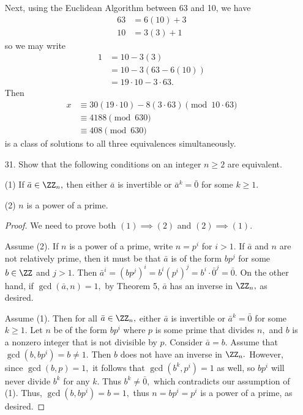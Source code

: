 \documentclass{article}
\begin{document}
\begin{itemize}
\begin{soln}
			Next, using the Euclidean Algorithm between 63 and 10, we have 
			\begin{align*}
				63 &= 6(10) + 3 \\
				10 &= 3(3) + 1
			\end{align*} so we may write 
			\begin{align*}
				1 &= 10 - 3(3) \\
				&= 10 - 3(63 - 6(10)) \\
				&= 19\cdot10-3\cdot63.
			\end{align*} Then 
			\begin{align*}
				x &\equiv 30(19\cdot10)-8(3\cdot63)\pmod{10\cdot63} \\
				&\equiv 4188 \pmod {630} \\
				&\equiv \boxed{408\pmod{630}}
			\end{align*} is a class of solutions to all three equivalences simultaneously. 
		\end{soln}

	\item[31.] Show that the following conditions on an integer $n\ge2$ are equivalent.

		(1) If $\bar{a}\in\ZZ_n,$ then either $\bar{a}$ is invertible or $\bar{a}^k=\bar{0}$ for some $k\ge 1.$

		(2) $n$ is a power of a prime.
		\begin{proof}
			We need to prove both $(1)\implies(2)$ and $(2)\implies(1).$ 

			Assume (2). If $n$ is a power of a prime, write $n=p^i$ for $i>1.$ If $\bar{a}$ and $n$ are not relatively prime, then it must be that $\bar{a}$ is of the form $bp^j$ for some $b\in\ZZ$ and $j>1.$ Then $\bar{a}^i=(bp^j)^i=b^i(p^i)^j=b^i\cdot \bar{0}^j = \bar{0}.$ On the other hand, if $\gcd(\bar{a}, n)=1,$ by Theorem 5, $\bar{a}$ has an inverse in $\ZZ_n,$ as desired.

			Assume (1). Then for all $\bar{a}\in\ZZ_n,$ either $\bar{a}$ is invertible or $\bar{a}^k=\bar{0}$ for some $k\ge1.$ Let $n$ be of the form $bp^i$ where $p$ is some prime that divides $n,$ and $b$ is a nonzero integer that is not divisible by $p.$  Consider $\bar{a}=b.$ Assume that $\gcd(b, bp^i)=b\neq 1.$ Then $b$ does not have an inverse in $\ZZ_n.$ However, since $\gcd(b, p)=1,$ it follows that $\gcd(b^k, p^i)=1$ as well, so $bp^i$ will never divide $b^k$ for any $k.$ Thus $b^k\neq \bar{0},$ which contradicts our assumption of (1). Thus, $\gcd(b, bp^i)=b=1,$ thus $n=bp^i=p^i$ is a power of a prime, as desired.
			
		\end{proof}

\end{itemize}
\end{document}
